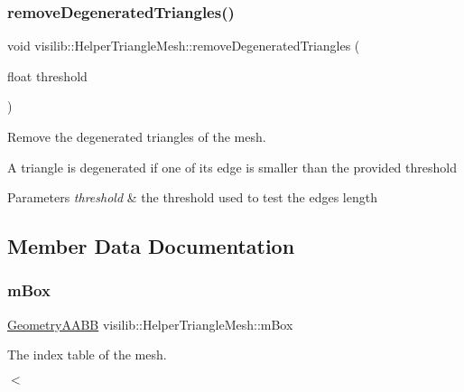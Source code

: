 \subsubsection{\texorpdfstring{removeDegeneratedTriangles()}{removeDegeneratedTriangles()}}
{\footnotesize\ttfamily void visilib\+::\+Helper\+Triangle\+Mesh\+::remove\+Degenerated\+Triangles (\begin{DoxyParamCaption}\item[{float}]{threshold }\end{DoxyParamCaption})\hspace{0.3cm}{\ttfamily [inline]}}



Remove the degenerated triangles of the mesh. 

A triangle is degenerated if one of its edge is smaller than the provided threshold 
\begin{DoxyParams}{Parameters}
{\em threshold} & the threshold used to test the edges length \\
\hline
\end{DoxyParams}


\subsection{Member Data Documentation}
\mbox{\label{classvisilib_1_1_helper_triangle_mesh_a6e648db3f9ca746b4a0f5ebd67113662}} 
\subsubsection{\texorpdfstring{mBox}{mBox}}
{\footnotesize\ttfamily \mbox{\hyperlink{classvisilib_1_1_geometry_a_a_b_b}{Geometry\+A\+A\+BB}} visilib\+::\+Helper\+Triangle\+Mesh\+::m\+Box\hspace{0.3cm}{\ttfamily [private]}}



The index table of the mesh. 

$<$ \mbox{\label{classvisilib_1_1_helper_triangle_mesh_aceac95ff741e999a29dc8eae52735c70}} 
